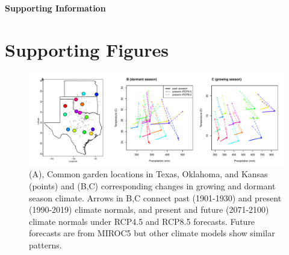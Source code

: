 \documentclass[12pt]{article}\usepackage[]{graphicx}\usepackage[dvipsnames]{xcolor}
\begin{document}
\newpage



\newpage
\clearpage 
\setcounter{equation}{0}
\setcounter{figure}{0}
\setcounter{section}{0}
\setcounter{table}{0}
\renewcommand{\theequation}{S.\arabic{equation}}
\renewcommand{\thetable}{S-\arabic{table}}
\renewcommand{\thefigure}{S-\arabic{figure}}
\renewcommand{\thesection}{S.\arabic{section}}

\centerline{\Large{\textbf{Supporting Information}}}



\section {Supporting Figures}

\begin{figure}[H]
	\centering
	\includegraphics[width=0.959\linewidth]{Figures/tom_map_v1.pdf}
	\caption{(A), Common garden locations in Texas, Oklahoma, and Kansas (points) and (B,C) corresponding changes in growing and dormant season climate. Arrows in B,C connect past (1901-1930) and present (1990-2019) climate normals, and present and future (2071-2100) climate normals under RCP4.5 and RCP8.5 forecasts. Future forecasts are from MIROC5 but other climate models show similar patterns.}
	\label{Sup:climate_variation1}
\end{figure}

\end{document}
